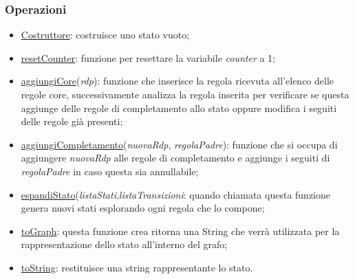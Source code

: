 \documentclass[12pt]{article}
\begin{document}
\subsubsection{Operazioni}
\begin{itemize}
\item\underline{Costruttore}: costruisce uno stato vuoto;
\item\underline{resetCounter}: funzione per resettare la variabile \textit{counter} a 1;
\item\underline{aggiungiCore}(\textit{rdp}): funzione che inserisce la regola ricevuta all'elenco delle regole core, successivamente analizza la regola inserita per verificare se questa aggiunge delle regole di completamento allo stato oppure modifica i seguiti delle regole già presenti;
\item\underline{aggiungiCompletamento}(\textit{nuovaRdp}, \textit{regolaPadre}): funzione che si occupa di aggiungere \textit{nuovaRdp} alle regole di completamento e aggiunge i seguiti di \textit{regolaPadre} in caso questa sia annullabile;
\item\underline{espandiStato}(\textit{listaStati},\textit{listaTransizioni}: quando chiamata questa funzione genera nuovi stati esplorando ogni regola che lo compone;
\item\underline{toGraph}: questa funzione crea ritorna una String che verrà utilizzata per la rappresentazione dello stato all'interno del grafo;
\item\underline{toString}: restituisce una string rappresentante lo stato.
\end{itemize}
\end{document}
